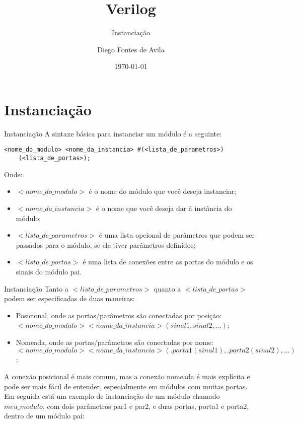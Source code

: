 \documentclass[aspectratio=169,xcolor=dvipsnames]{beamer}
\title{Verilog}
\subtitle{Instanciação}
\author{Diego Fontes de Avila}
\institute
{
    Poliware \\
    Escola Politécnica da Universidade de São Paulo %
}
\date{\today} %
\begin{document}
\begin{frame}
    \titlepage
\end{frame}

\section{Instanciação}

\begin{frame}[fragile]{Instanciação}
    A sintaxe básica para instanciar um módulo é a seguinte:

        \begin{block}{}
        \begin{verbatim}
<nome_do_modulo> <nome_da_instancia> #(<lista_de_parametros>)
    (<lista_de_portas>);
        \end{verbatim}
    \end{block}

    Onde:
    \begin{itemize}
        \item $<nome\_do\_modulo>$ é o nome do módulo que você deseja instanciar;
        \item $<nome\_da\_instancia>$ é o nome que você deseja dar à instância do módulo;
        \item $<lista\_de\_parametros>$ é uma lista opcional de parâmetros que podem ser passados para o módulo, se ele tiver parâmetros definidos;
        \item $<lista\_de\_portas>$ é uma lista de conexões entre as portas do módulo e os sinais do módulo pai.
    \end{itemize}

\end{frame}

\begin{frame}{Instanciação}
    Tanto a $<lista\_de\_parametros>$ quanto a $<lista\_de\_portas>$ podem ser especificadas de duas maneiras:
    \begin{itemize}
        \item Posicional, onde as portas/parâmetros são conectadas por posição: $<nome\_do\_modulo> <nome\_da\_instancia> (sinal1, sinal2, ...)$;
        \item Nomeada, onde as portas/parâmetros são conectadas por nome: $<nome\_do\_modulo> <nome\_da\_instancia> (.porta1(sinal1), .porta2(sinal2), ...)$;
    \end{itemize}
    A conexão posicional é mais comum, mas a conexão nomeada é mais explícita e pode ser mais fácil de entender, especialmente em módulos com muitas portas. Em seguida está um exemplo de instanciação de um módulo chamado $meu\_modulo$, com dois parâmetros par1 e par2, e duas portas, porta1 e porta2, dentro de um módulo pai:
\end{frame}
\end{document}
